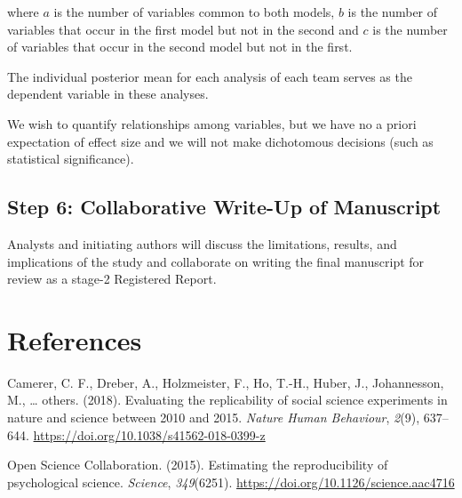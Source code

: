 \documentclass[
  english,
  man]{apa6}
\begin{document}
where \(a\) is the number of variables common to both models, \(b\) is the number of variables that occur in the first model but not in the second and \(c\) is the number of variables that occur in the second model but not in the first.

The individual posterior mean for each analysis of each team serves as the dependent variable in these analyses.

We wish to quantify relationships among variables, but we have no a priori expectation of effect size and we will not make dichotomous decisions (such as statistical significance).

\hypertarget{step-6-collaborative-write-up-of-manuscript}{%
\subsection{Step 6: Collaborative Write-Up of Manuscript}\label{step-6-collaborative-write-up-of-manuscript}}

Analysts and initiating authors will discuss the limitations, results, and implications of the study and collaborate on writing the final manuscript for review as a stage-2 Registered Report.

\newpage

\hypertarget{references}{%
\section{References}\label{references}}

\begingroup
\setlength{\parindent}{-0.5in}
\setlength{\leftskip}{0.5in}

\hypertarget{refs}{}
\leavevmode\hypertarget{ref-camerer2018evaluating}{}%
Camerer, C. F., Dreber, A., Holzmeister, F., Ho, T.-H., Huber, J., Johannesson, M., \ldots{} others. (2018). Evaluating the replicability of social science experiments in nature and science between 2010 and 2015. \emph{Nature Human Behaviour}, \emph{2}(9), 637--644. \url{https://doi.org/10.1038/s41562-018-0399-z}

\leavevmode\hypertarget{ref-open2015estimating}{}%
Open Science Collaboration. (2015). Estimating the reproducibility of psychological science. \emph{Science}, \emph{349}(6251). \url{https://doi.org/10.1126/science.aac4716}

\endgroup
\end{document}
